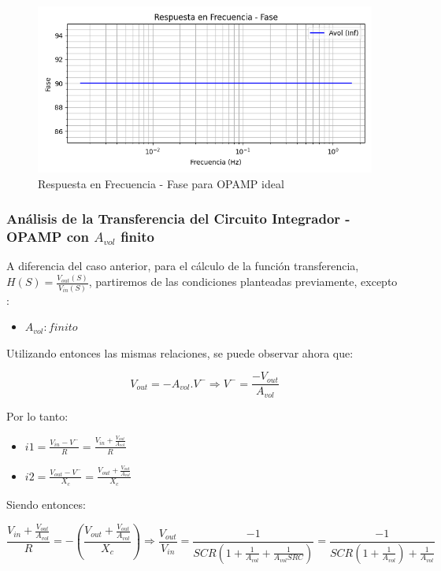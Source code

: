 \begin{figure}[H]
    \centering 
    \includegraphics [scale=1] {../Ejercicio3-CircuitoIntegradoresyDerivadores/Imagenes/teorico-avol-inf-integrador-fase.png} 
    \caption{Respuesta en Frecuencia - Fase para OPAMP ideal}
    \label{fig:emptyPlotTool}
\end{figure}

\subsubsection{Análisis de la Transferencia del Circuito Integrador - OPAMP con $A_{vol}$ finito}

A diferencia del caso anterior, para el cálculo de la función transferencia, $H(S) = \frac{V_{out} (S)}{V_{in} (S)}$, partiremos de las condiciones planteadas previamente, excepto
:

\begin{itemize}
	\item $A_{vol}: finito$
\end{itemize}

Utilizando entonces las mismas relaciones, se puede observar ahora que:


$$V_{out}=-A_{vol}.V^{-} \Longrightarrow V^{-} = \frac{-V_{out}}{A_{vol}}$$ 


Por lo tanto:

\begin{itemize}
	\item $i1 = \frac {V_{in}-V^{-}}{R} =  \frac {V_{in} + \frac{V_{out}}{A_{vol}}}{R}$
	\item $i2 = \frac {V_{out}-V^{-}}{X_c} = \frac {V_{out} + \frac{V_{out}}{A_{vol}}}{X_c}$
\end{itemize}

Siendo entonces:

$$ \frac {V_{in} + \frac{V_{out}}{A_{vol}}}{R} = -(\frac {V_{out} + \frac{V_{out}}{A_{vol}}}{X_c})
\Longrightarrow \frac{V_{out}}{V_{in}} = \frac{-1}{SCR(1+\frac{1}{A_{vol}}+\frac{1}{A_{vol}SRC})} = \frac{-1}{SCR(1+\frac{1}{A_{vol}})+\frac{1}{A_{vol}}}$$

